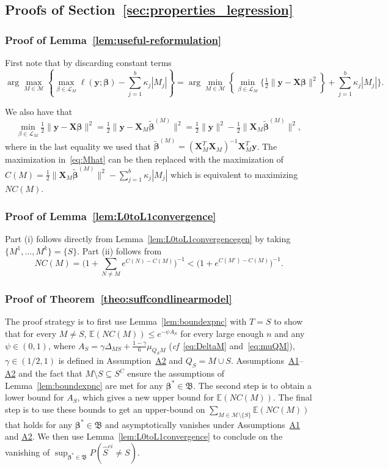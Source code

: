 \documentclass[
  12pt]{article}
\newcommand{\E}{\mathbb{E}}
\newcommand{\M}{\mathcal{M}}
\newcommand{\by}{\mathbf{y}}
\newcommand{\bbeta}{\boldsymbol{\beta}}
\newcommand{\bX}{\mathbf{X}}
\newcommand{\bB}{\mathfrak{B}}
\begin{document}
\subsection{Proofs of Section~\ref{sec:properties_legression}}\label{suppsec:proofseclinreg}
\subsubsection{Proof of Lemma~\ref{lem:useful-reformulation}}
	First note that by discarding constant terms 
 $$\arg\max_{M\in \M} \left\{\max_{\beta\in \mathcal{L}_M}\ell(\by; \bbeta)-\sum_{j=1}^b\kappa_j |M_j| \right\}=\arg\min_{M\in \M} \left\{\min_{\beta\in \mathcal{L}_M}\bigg\{ \tfrac{1}{2}\|\by-\bX\bbeta\|^2\right\}+\sum_{j=1}^b\kappa_j |M_j| \bigg\}.$$
 
 We also have that 
 $$\min_{\beta\in \mathcal{L}_M} \tfrac{1}{2}\|\by-\bX\bbeta\|^2=\tfrac{1}{2}\|\by-\bX_{\!\!M}\tilde{\bbeta}^{(M)}\|^2=\tfrac{1}{2}\|\by\|^2-\tfrac{1}{2}\|\bX_{\!\!M}\tilde{\bbeta}^{(M)}\|^2,$$
where in the last equality we used that $\tilde{\bbeta}^{(M)}= (\bX_M^T \bX_M)^{-1} \bX_M^T \by$.
 The maximization in~\eqref{eq:Mhat} can be then replaced with the maximization of $C(M)=\tfrac{1}{2}
 \|\bX_{\!\!M}\tilde{\bbeta}^{(M)}\|^2-\sum_{j=1}^b \kappa_j|M_j|$ which is equivalent to maximizing $NC(M)$.

\subsubsection{Proof of Lemma~\ref{lem:L0toL1convergence}}
Part (i) follows directly from Lemma~\ref{lem:L0toL1convergencegen} by taking $\{M^1,\ldots,M^k\}=\{S\}$.
Part (ii) follows from
$$NC(M)=\Big(1+\sum_{N \neq M} e^{C(N)-C(M)}\Big)^{-1}
< \big(1+ e^{C(M')-C(M)}\big)^{-1}.$$ 

\subsubsection{Proof of Theorem~\ref{theo:suffcondlinearmodel}} 
The proof strategy is to first use Lemma~\ref{lem:boundexpnc} with $T=S$ to show that for every $M\neq S$, $\E(NC(M)) \leq e^{-\psi A_S}$ for every large enough $n$ and any $\psi \in (0,1)$, where $A_S=\gamma\Delta_{MS}+\tfrac{1-\gamma}{6}\mu_{Q_SM}$ (\emph{cf}~\eqref{eq:DeltaM} and~\eqref{eq:muQM}), $\gamma\in(1/2,1)$ is defined in Assumption~\hyperlink{lab:A2}{A2} and $Q_S= M\cup S$. Assumptions~\hyperlink{lab:A1}{A1}--\hyperlink{lab:A2}{A2} and the fact that $M\setminus S\subseteq S^C$ ensure the 
assumptions of Lemma~\ref{lem:boundexpnc} are met for any $\bbeta^*\in \bB$. 
The second step is to obtain a lower bound for $A_S$, which gives a new upper bound for $\E(NC(M))$.
The final step is to use these bounds to get an upper-bound on $\sum_{M \in \M\setminus \{S\}} \E\left(NC(M)\right)$ that holds for any $\bbeta^*\in \bB$ and asymptotically vanishes under Assumptions~\hyperlink{lab:A1}{A1} and \hyperlink{lab:A2}{A2}. We then use Lemma~\ref{lem:L0toL1convergence} to conclude on the vanishing of $\sup_{\bbeta^*\in \bB}P(\hat{S}^{ei} \neq S)$. 
\end{document}
